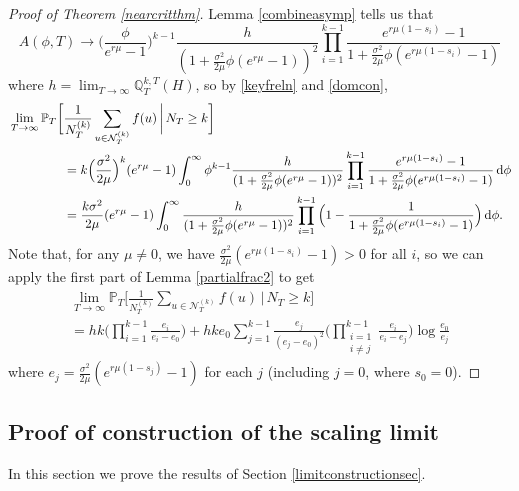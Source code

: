 \documentclass{article}
\theoremstyle{plain}
\theoremstyle{definition}
\newcommand{\Q}{\mathbb{Q}}
\renewcommand{\P}{\mathbb{P}}
\newcommand{\Nc}{\mathcal{N}}
\renewcommand{\d}{{\rm{d}}}
\begin{document}
\begin{proof}[Proof of Theorem \ref{nearcritthm}]
Lemma \ref{combineasymp} tells us that
\[A(\phi,T)\to \Big(\frac{\phi}{e^{r\mu}-1}\Big)^{k-1}\frac{h}{(1+\frac{\sigma^2}{2\mu}\phi(e^{r\mu}-1))^2} \prod_{i=1}^{k-1} \frac{e^{r\mu(1-s_i)}-1}{1+\frac{\sigma^2}{2\mu}\phi(e^{r\mu(1-s_i)}-1)}\]
where $h=\lim_{T\to\infty} \Q^{k,T}_T(H)$, so by \eqref{keyfreln} and \eqref{domcon},
\begin{align*}
&\lim_{T\to\infty} \P_T\bigg[\frac{1}{N_T^{(k)}} \sum_{u\in \Nc_T^{(k)}} f(u) \, \bigg| \, N_T \ge k\bigg]\\
&\hspace{15mm} = k\Big(\frac{\sigma^2}{2\mu}\Big)^k(e^{r\mu}-1) \int_0^\infty \phi^{k-1} \frac{h}{(1+\frac{\sigma^2}{2\mu}\phi(e^{r\mu}-1))^2} \prod_{i=1}^{k-1} \frac{e^{r\mu(1-s_i)}-1}{1+\frac{\sigma^2}{2\mu}\phi(e^{r\mu(1-s_i)}-1)}\, \d\phi\\
&\hspace{15mm} = \frac{k\sigma^2}{2\mu}(e^{r\mu}-1) \int_0^\infty \frac{h}{(1+\frac{\sigma^2}{2\mu}\phi(e^{r\mu}-1))^2} \prod_{i=1}^{k-1} \Big(1-\frac{1}{1+\frac{\sigma^2}{2\mu}\phi(e^{r\mu(1-s_i)}-1)}\Big)\, \d\phi.
\end{align*}
Note that, for any $\mu\neq 0$, we have $\frac{\sigma^2}{2\mu}(e^{r\mu(1-s_i)}-1)>0$ for all $i$, so we can apply the first part of Lemma \ref{partialfrac2} to get
\begin{multline*}
\lim_{T\to\infty} \P_T\bigg[\frac{1}{N_T^{(k)}} \sum_{u\in \Nc_T^{(k)}} f(u) \, \bigg| \, N_T \ge k\bigg]\\
= hk\bigg(\prod_{i=1}^{k-1} \frac{e_i}{e_i-e_0}\bigg) + hke_0\sum_{j=1}^{k-1} \frac{e_j}{(e_j-e_0)^2}\bigg(\prod_{\substack{i=1\\ i\neq j}}^{k-1} \frac{e_i}{e_i-e_j}\bigg)\log \frac{e_0}{e_j}
\end{multline*}
where $e_j = \frac{\sigma^2}{2\mu}(e^{r\mu(1-s_j)}-1)$ for each $j$ (including $j=0$, where $s_0=0$).
\end{proof}



\subsection{Proof of construction of the scaling limit}

In this section we prove the results of Section \ref{limitconstructionsec}.
\end{document}
